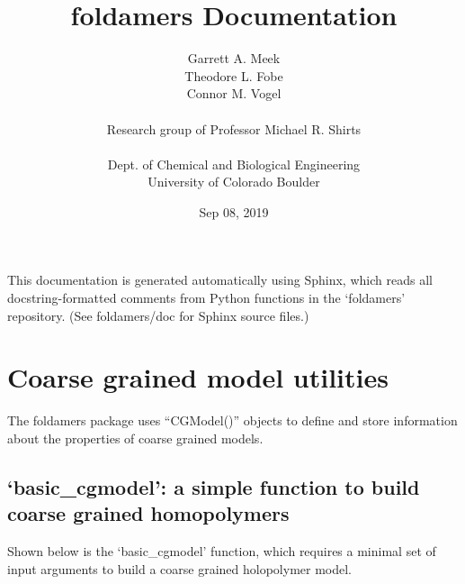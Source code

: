 \documentclass[letterpaper,12pt,english,openany,oneside]{sphinxmanual}
\title{foldamers Documentation}
\date{Sep 08, 2019}
\author{Garrett A. Meek\\Theodore L. Fobe\\Connor M. Vogel\\ \\Research group of Professor Michael R. Shirts\\ \\Dept. of Chemical and Biological Engineering\\University of Colorado Boulder}
\begin{document}
\pagestyle{empty}
\maketitle
\pagestyle{plain}
\sphinxtableofcontents
\pagestyle{normal}
\label{\detokenize{index::doc}}


This documentation is generated automatically using Sphinx, which reads all docstring-formatted comments from Python functions in the ‘foldamers’ repository.  (See foldamers/doc for Sphinx source files.)


\chapter{Coarse grained model utilities}
\label{\detokenize{cg_model:coarse-grained-model-utilities}}\label{\detokenize{cg_model::doc}}
The foldamers package uses “CGModel()” objects to define and store information about the properties of coarse grained models.


\section{‘basic\_cgmodel’: a simple function to build coarse grained homopolymers}
\label{\detokenize{cg_model:basic-cgmodel-a-simple-function-to-build-coarse-grained-homopolymers}}
Shown below is the ‘basic\_cgmodel’ function, which requires a minimal set of input arguments to build a coarse grained holopolymer model.

\label{\detokenize{cg_model:module-cg_model.cgmodel}}
\end{document}
